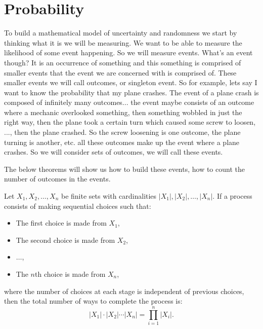 \documentclass[../main.tex]{subfiles}
\begin{document}
\section{Probability}

\begin{remark}
To build a mathematical model of uncertainty and randomness we start by thinking what it is we will be measuring. We want to be able to measure the likelihood of some event happening. So we will measure events. What's an event though? It is an occurrence of something and this something is comprised of smaller events that the event we are concerned with is comprised of. These smaller events we will call outcomes, or singleton event. So for example, lets say I want to know the probability that my plane crashes. The event of a plane crash is composed of infinitely many outcomes... the event maybe consists of an outcome where a mechanic overlooked something, then something wobbled in just the right way, then the plane took a certain turn which caused some screw to loosen, ..., then the plane crashed. So the screw loosening is one outcome, the plane turning is another, etc. all these outcomes make up the event where a plane crashes. So we will consider sets of outcomes, we will call these events. 


\end{remark}



\begin{remark}
The below theorems will show us how to build these events, how to count the number of outcomes in the events. 
\end{remark}



\begin{theorem}
Let \( X_1, X_2, \dots, X_n \) be finite sets with cardinalities \( |X_1|, |X_2|, \dots, |X_n| \). If a process consists of making sequential choices such that:
\begin{itemize}
    \item The first choice is made from \( X_1 \),
    \item The second choice is made from \( X_2 \),
    \item \(\dots\),
    \item The \( n \)th choice is made from \( X_n \),
\end{itemize}
where the number of choices at each stage is independent of previous choices, then the total number of ways to complete the process is:
\[
|X_1| \cdot |X_2| \cdots |X_n| = \prod_{i=1}^{n} |X_i|.
\]
\end{theorem}
\end{document}
